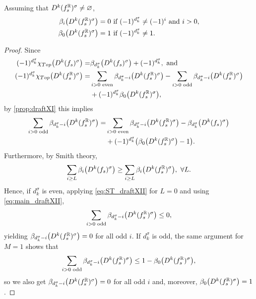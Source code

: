 \documentclass[a4paper,12pt]{amsart}
\begin{document}
\begin{corollary}\label{prop:draftXII}
Assuming that $D^k(f_s^{\mathbb{R}})^\sigma\neq\varnothing$,
\[\begin{aligned}
\beta_i\big(D^k(f_s^{\mathbb{R}})^\sigma\big)&=0\text{ if } (-1)^{d_k^\sigma}\neq(-1)^i \text{ and }i>0,\\
\beta_0\big(D^k(f_s^{\mathbb{R}})^\sigma\big)&=1\text{ if } (-1)^{d_k^\sigma}\neq1.
\end{aligned}\]
\end{corollary}
\begin{proof}
Since
\begin{align*}
(-1)^{d_k^\sigma}\chi_{Top}\big(D^k(f_s)^\sigma\big)  =& \beta_{d_k^\sigma}\big(D^k(f_s)^\sigma\big) + (-1)^{d_k^\sigma},\text{ and}\\
(-1)^{d_k^\sigma}\chi_{Top}\big(D^k(f_s^{\mathbb{R}})^\sigma\big) =& \sum_{ i > 0\text{ even}}\beta_{d_k^\sigma - i}\big(D^k(f_s^{\mathbb{R}})^\sigma\big) - \sum_{ i > 0\text{ odd}}\beta_{d_k^\sigma - i}\big(D^k(f_s^{\mathbb{R}})^\sigma\big) \\ & + (-1)^{d_k^\sigma}\beta_{0}\big(D^k(f_s^{\mathbb{R}})^\sigma\big),
\end{align*}
by \cref{prop:draftXI} this implies
\begin{equation}\label{eq:main_draftXII}
\begin{split}
\sum_{ i > 0 \text{ odd}}\beta_{d_k^\sigma - i}\big(D^k(f_s^{\mathbb{R}})^\sigma\big)  =&  \sum_{ i > 0 \text{ even}}\beta_{d_k^\sigma - i}\big(D^k(f_s^{\mathbb{R}})^\sigma\big) - \beta_{d_k^\sigma}\big(D^k(f_s)^\sigma\big) \\
 & + (-1)^{d_k^\sigma}\big(\beta_{0}\big(D^k(f_s^{\mathbb{R}})^\sigma\big)-1\big).
 \end{split}
\end{equation}
Furthermore, by Smith theory,
\begin{equation}\label{eq:ST_draftXII}
\sum_{i\geq L}\beta_{i}\big(D^k(f_s)^\sigma\big) \geq \sum_{i \geq L}\beta_{i}\big(D^k(f_s^{\mathbb{R}})^\sigma\big),\ \forall L.
\end{equation}
Hence, if $d_k^\sigma$ is even, applying \cref{eq:ST_draftXII} for $L=0$ and using \cref{eq:main_draftXII},
\[\sum_{ i > 0 \text{ odd}}\beta_{d_k^\sigma - i}\big(D^k(f_s^{\mathbb{R}})^\sigma\big) \leq 0,\]
yielding $\beta_{d_k^\sigma - i}\big(D^k(f_s^{\mathbb{R}})^\sigma\big) = 0$ for all odd $i$.
If $d_k^\sigma$ is odd, the same argument for $M=1$ shows that
\[\sum_{ i > 0\text{ odd}}\beta_{d_k^\sigma - i}\big(D^k(f_s^{\mathbb{R}})^\sigma\big) \leq 1-\beta_{0}\big(D^k(f_s^{\mathbb{R}})^\sigma\big),\]
so we also get $\beta_{d_k^\sigma - i}\big(D^k(f_s^{\mathbb{R}})^\sigma\big) = 0$ for all odd $i$ and, moreover, $\beta_{0}\big(D^k(f_s^{\mathbb{R}})^\sigma\big)=1$.
\end{proof}
\end{document}
